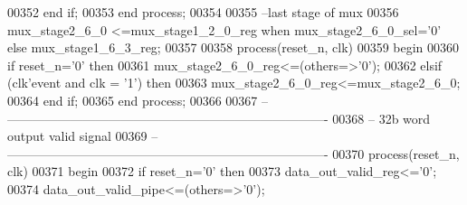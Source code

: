 \begin{DoxyCode}
00352         \textcolor{keywordflow}{end} \textcolor{keywordflow}{if};
00353     \textcolor{keywordflow}{end} \textcolor{keywordflow}{process};
00354 
00355 \textcolor{keyword}{--last stage of mux}
00356 \textcolor{vhdlchar}{mux_stage2_6_0}  \textcolor{vhdlchar}{<=}\textcolor{vhdlchar}{mux_stage1_2_0_reg} \textcolor{keywordflow}{when} \textcolor{vhdlchar}{mux_stage2_6_0_sel}\textcolor{vhdlchar}{=}\textcolor{vhdlchar}{'}\textcolor{vhdllogic}{}\textcolor{vhdllogic}{0}\textcolor{vhdlchar}{'} \textcolor{keywordflow}{else} \textcolor{vhdlchar}{
      mux_stage1_6_3_reg};
00357 
00358   \textcolor{keywordflow}{process}(reset_n, clk)
00359 \textcolor{vhdlkeyword}{    begin}
00360       \textcolor{keywordflow}{if} \textcolor{vhdlchar}{reset_n}\textcolor{vhdlchar}{=}\textcolor{vhdlchar}{'}\textcolor{vhdllogic}{}\textcolor{vhdllogic}{0}\textcolor{vhdlchar}{'} \textcolor{keywordflow}{then}
00361             \textcolor{vhdlchar}{mux_stage2_6_0_reg}\textcolor{vhdlchar}{<=}\textcolor{vhdlchar}{(}\textcolor{keywordflow}{others}\textcolor{vhdlchar}{=}\textcolor{vhdlchar}{>}\textcolor{vhdlchar}{'}\textcolor{vhdllogic}{}\textcolor{vhdllogic}{0}\textcolor{vhdlchar}{'}\textcolor{vhdlchar}{)};
00362       \textcolor{keywordflow}{elsif} \textcolor{vhdlchar}{(}\textcolor{vhdlchar}{clk}\textcolor{vhdlchar}{'}\textcolor{vhdlkeyword}{event} \textcolor{keywordflow}{and} \textcolor{vhdlchar}{clk} \textcolor{vhdlchar}{=} \textcolor{vhdlchar}{'}\textcolor{vhdllogic}{}\textcolor{vhdllogic}{1}\textcolor{vhdlchar}{'}\textcolor{vhdlchar}{)} \textcolor{keywordflow}{then}
00363             \textcolor{vhdlchar}{mux_stage2_6_0_reg}\textcolor{vhdlchar}{<=}\textcolor{vhdlchar}{mux_stage2_6_0};
00364         \textcolor{keywordflow}{end} \textcolor{keywordflow}{if};
00365     \textcolor{keywordflow}{end} \textcolor{keywordflow}{process};
00366 
00367 \textcolor{keyword}{-- ----------------------------------------------------------------------------}
00368 \textcolor{keyword}{-- 32b word output valid signal}
00369 \textcolor{keyword}{-- ----------------------------------------------------------------------------}
00370   \textcolor{keywordflow}{process}(reset_n, clk)
00371 \textcolor{vhdlkeyword}{    begin}
00372       \textcolor{keywordflow}{if} \textcolor{vhdlchar}{reset_n}\textcolor{vhdlchar}{=}\textcolor{vhdlchar}{'}\textcolor{vhdllogic}{}\textcolor{vhdllogic}{0}\textcolor{vhdlchar}{'} \textcolor{keywordflow}{then}
00373             \textcolor{vhdlchar}{data_out_valid_reg}\textcolor{vhdlchar}{<=}\textcolor{vhdlchar}{'}\textcolor{vhdllogic}{}\textcolor{vhdllogic}{0}\textcolor{vhdlchar}{'};
00374          \textcolor{vhdlchar}{data_out_valid_pipe}\textcolor{vhdlchar}{<=}\textcolor{vhdlchar}{(}\textcolor{keywordflow}{others}\textcolor{vhdlchar}{=}\textcolor{vhdlchar}{>}\textcolor{vhdlchar}{'}\textcolor{vhdllogic}{}\textcolor{vhdllogic}{0}\textcolor{vhdlchar}{'}\textcolor{vhdlchar}{)};

\end{DoxyCode}
